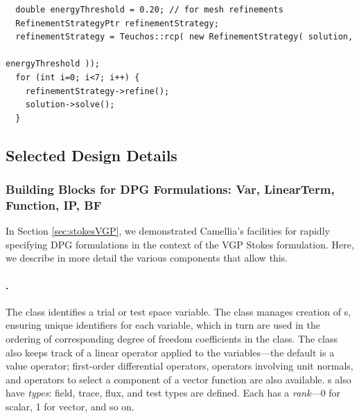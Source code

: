 \begin{lstlisting}
  double energyThreshold = 0.20; // for mesh refinements
  RefinementStrategyPtr refinementStrategy;
  refinementStrategy = Teuchos::rcp( new RefinementStrategy( solution, 
                                                             energyThreshold ));
  for (int i=0; i<7; i++) {
    refinementStrategy->refine();
    solution->solve();
  }
\end{lstlisting}

\subsection{Selected Design Details}\label{sec:selectedDesignDetails}
\subsubsection{Building Blocks for DPG Formulations: Var, LinearTerm, Function, IP, BF}
\label{NVR:sec:formulationClasses}
In Section \ref{sec:stokesVGP}, we demonstrated Camellia's facilities for rapidly specifying DPG formulations in the context of the VGP Stokes formulation.  Here, we describe in more detail the various components that allow this.

\paragraph{.}  The  class identifies a trial or test space variable.  The  class manages creation of s, ensuring unique identifiers for each variable, which in turn are used in the ordering of corresponding degree of freedom coefficients in the  class.  The  class also keeps track of a linear operator applied to the variables---the default is a value operator; first-order differential operators, operators involving unit normals, and operators to select a component of a vector function are also available.  s also have \emph{types}: field, trace, flux, and test types are defined.  Each  has a \emph{rank}---0 for scalar, 1 for vector, and so on.

